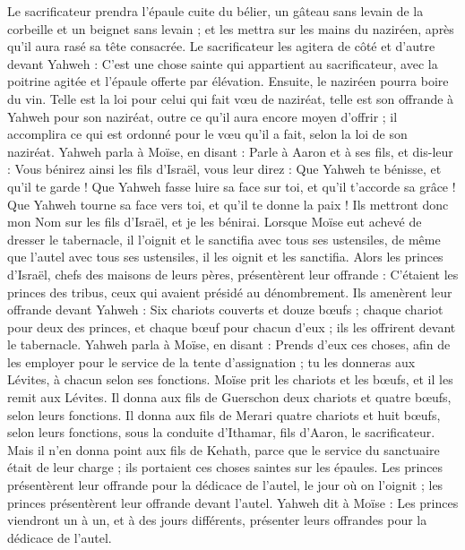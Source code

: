 \begin{multicols}{2}
Le sacrificateur prendra l'épaule cuite du bélier, un gâteau sans levain de la corbeille et un beignet sans levain ; et les mettra sur les mains du naziréen, après qu'il aura rasé sa tête consacrée.
Le sacrificateur les agitera de côté et d’autre devant Yahweh : C'est une chose sainte qui appartient au sacrificateur, avec la poitrine agitée et l'épaule offerte par élévation. Ensuite, le naziréen pourra boire du vin.
Telle est la loi pour celui qui fait vœu de naziréat, telle est son offrande à Yahweh pour son naziréat, outre ce qu'il aura encore moyen d'offrir ; il accomplira ce qui est ordonné pour le vœu qu'il a fait, selon la loi de son naziréat.
Yahweh parla à Moïse, en disant :
Parle à Aaron et à ses fils, et dis-leur : Vous bénirez ainsi les fils d'Israël, vous leur direz :
Que Yahweh te bénisse, et qu’il te garde !
Que Yahweh fasse luire sa face sur toi, et qu’il t’accorde sa grâce !
Que Yahweh tourne sa face vers toi, et qu’il te donne la paix !
Ils mettront donc mon Nom sur les fils d'Israël, et je les bénirai.
\VerseOne{}Lorsque Moïse eut achevé de dresser le tabernacle, il l’oignit et le sanctifia avec tous ses ustensiles, de même que l'autel avec tous ses ustensiles, il les oignit et les sanctifia.
Alors les princes d'Israël, chefs des maisons de leurs pères, présentèrent leur offrande : C’étaient les princes des tribus, ceux qui avaient présidé au dénombrement.
Ils amenèrent leur offrande devant Yahweh : Six chariots couverts et douze bœufs ; chaque chariot pour deux des princes, et chaque bœuf pour chacun d'eux ; ils les offrirent devant le tabernacle.
Yahweh parla à Moïse, en disant :
Prends d’eux ces choses, afin de les employer pour le service de la tente d'assignation ; tu les donneras aux Lévites, à chacun selon ses fonctions.
Moïse prit les chariots et les bœufs, et il les remit aux Lévites.
Il donna aux fils de Guerschon deux chariots et quatre bœufs, selon leurs fonctions.
Il donna aux fils de Merari quatre chariots et huit bœufs, selon leurs fonctions, sous la conduite d'Ithamar, fils d'Aaron, le sacrificateur.
Mais il n'en donna point aux fils de Kehath, parce que le service du sanctuaire était de leur charge ; ils portaient ces choses saintes sur les épaules.
Les princes présentèrent leur offrande pour la dédicace de l'autel, le jour où on l’oignit ; les princes présentèrent leur offrande devant l'autel.
Yahweh dit à Moïse : Les princes viendront un à un, et à des jours différents, présenter leurs offrandes pour la dédicace de l'autel.

\end{multicols}
